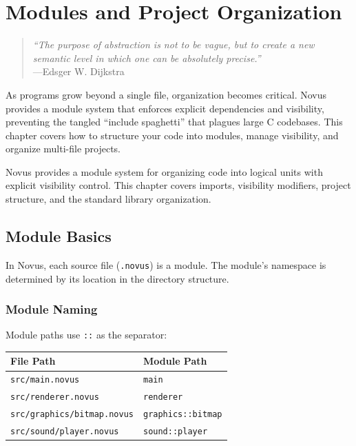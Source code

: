 \chapter{Modules and Project Organization}
\label{ch:modules}

\begin{quote}
\textit{``The purpose of abstraction is not to be vague, but to create a new semantic level in which one can be absolutely precise.''}\\
---Edsger W. Dijkstra
\end{quote}

\vspace{1em}

As programs grow beyond a single file, organization becomes critical. Novus provides a module system that enforces explicit dependencies and visibility, preventing the tangled ``include spaghetti'' that plagues large C codebases. This chapter covers how to structure your code into modules, manage visibility, and organize multi-file projects.

Novus provides a module system for organizing code into logical units with explicit visibility control. This chapter covers imports, visibility modifiers, project structure, and the standard library organization.

\section{Module Basics}
\label{sec:module-basics}

In Novus, each source file (\texttt{.novus}) is a module. The module's namespace is determined by its location in the directory structure.

\subsection{Module Naming}
\label{subsec:module-naming}

Module paths use \texttt{::} as the separator:

\begin{center}
\begin{tabular}{ll}
\textbf{File Path} & \textbf{Module Path} \\
\hline
\texttt{src/main.novus} & \texttt{main} \\
\texttt{src/renderer.novus} & \texttt{renderer} \\
\texttt{src/graphics/bitmap.novus} & \texttt{graphics::bitmap} \\
\texttt{src/sound/player.novus} & \texttt{sound::player} \\
\end{tabular}
\end{center}

